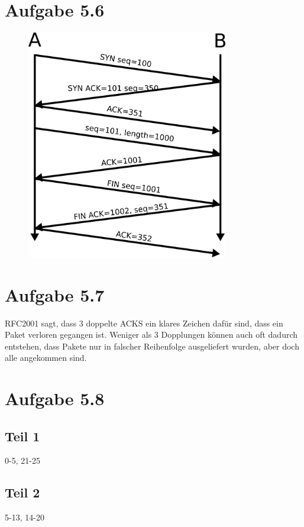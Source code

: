 \documentclass[10pt,a4paper]{article}
\begin{document}
\section{Aufgabe 5.6}

\begin{figure}[H]
  \centering
  \includegraphics[width=250pt]{5_6}
\end{figure}

\section{Aufgabe 5.7}

RFC2001 sagt, dass 3 doppelte ACKS ein klares Zeichen dafür sind, dass ein Paket
verloren gegangen ist. Weniger als 3 Dopplungen können auch oft dadurch
entstehen, dass Pakete nur in falscher Reihenfolge ausgeliefert wurden, aber
doch alle angekommen sind.

\section{Aufgabe 5.8}

\subsection{Teil 1}

0-5, 21-25

\subsection{Teil 2}

5-13, 14-20
\end{document}
